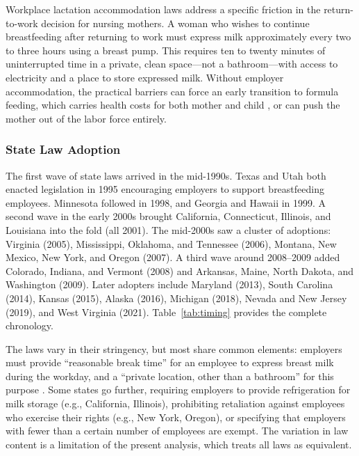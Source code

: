 \documentclass[12pt]{article}
\begin{document}
Workplace lactation accommodation laws address a specific friction in the return-to-work decision for nursing mothers. A woman who wishes to continue breastfeeding after returning to work must express milk approximately every two to three hours using a breast pump. This requires ten to twenty minutes of uninterrupted time in a private, clean space---not a bathroom---with access to electricity and a place to store expressed milk. Without employer accommodation, the practical barriers can force an early transition to formula feeding, which carries health costs for both mother and child \citep{aap2012, victora2016}, or can push the mother out of the labor force entirely.

\subsubsection*{State Law Adoption} The first wave of state laws arrived in the mid-1990s. Texas and Utah both enacted legislation in 1995 encouraging employers to support breastfeeding employees. Minnesota followed in 1998, and Georgia and Hawaii in 1999. A second wave in the early 2000s brought California, Connecticut, Illinois, and Louisiana into the fold (all 2001). The mid-2000s saw a cluster of adoptions: Virginia (2005), Mississippi, Oklahoma, and Tennessee (2006), Montana, New Mexico, New York, and Oregon (2007). A third wave around 2008--2009 added Colorado, Indiana, and Vermont (2008) and Arkansas, Maine, North Dakota, and Washington (2009). Later adopters include Maryland (2013), South Carolina (2014), Kansas (2015), Alaska (2016), Michigan (2018), Nevada and New Jersey (2019), and West Virginia (2021). Table~\ref{tab:timing} provides the complete chronology.

The laws vary in their stringency, but most share common elements: employers must provide ``reasonable break time'' for an employee to express breast milk during the workday, and a ``private location, other than a bathroom'' for this purpose \citep{ncsl2023}. Some states go further, requiring employers to provide refrigeration for milk storage (e.g., California, Illinois), prohibiting retaliation against employees who exercise their rights (e.g., New York, Oregon), or specifying that employers with fewer than a certain number of employees are exempt. The variation in law content is a limitation of the present analysis, which treats all laws as equivalent.
\end{document}
